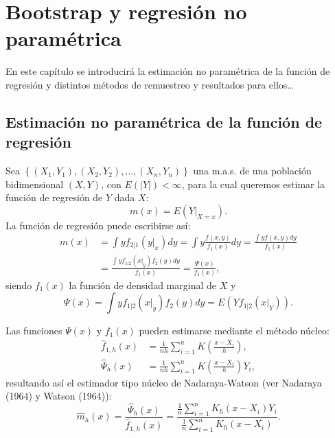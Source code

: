 \documentclass[
]{book}
\theoremstyle{definition}
\theoremstyle{definition}
\theoremstyle{definition}
\theoremstyle{remark}
\begin{document}
\hypertarget{cap7}{%
\chapter{Bootstrap y regresión no paramétrica}\label{cap7}}

En este capítulo se introducirá la estimación no paramétrica de la función de regresión y distintos métodos de remuestreo y resultados para ellos\ldots{}

\hypertarget{estimaciuxf3n-no-paramuxe9trica-de-la-funciuxf3n-de-regresiuxf3n}{%
\section{Estimación no paramétrica de la función de regresión}\label{estimaciuxf3n-no-paramuxe9trica-de-la-funciuxf3n-de-regresiuxf3n}}

Sea \(\left\{ \left( X_1,Y_1 \right),\left( X_2,Y_2 \right), \ldots, \left( X_n,Y_n \right) \right\}\) una m.a.s. de una población
bidimensional \(\left( X,Y \right)\), con \(E\left( \left\vert Y\right\vert  \right) <\infty\), para la cual queremos estimar la función de regresión
de \(Y\) dada \(X\):
\[m\left( x \right) =E\left( \left. Y\right\vert_{X=x} \right).\]
La función de regresión puede escribirse así:
\[\begin{aligned}
m\left( x \right) &= \int yf_{2|1}\left( \left. y\right\vert _{x} \right)
dy=\int y\frac{f\left( x,y \right)}{f_1\left( x \right)}dy=\frac{\int
yf\left( x,y \right) dy}{f_1\left( x \right)} \\
&= \frac{\int yf_{1|2}\left( \left. x\right\vert _{y} \right) f_2\left(
y \right) dy}{f_1\left( x \right)}=\frac{\Psi \left( x \right)}{f_1\left(
x \right)},
\end{aligned}\]
siendo \(f_1\left( x \right)\) la función de densidad marginal de \(X\) y
\[\Psi \left( x \right) =\int yf_{1|2}\left( \left. x\right\vert _{y} \right)
f_2\left( y \right) dy=E\left( Yf_{1|2}\left( \left. x\right\vert_{Y} \right)
\right).\]

Las funciones \(\Psi \left( x \right)\) y \(f_1\left( x \right)\) pueden
estimarse mediante el método núcleo:
\[\begin{aligned}
\hat{f}_{1,h}\left( x \right) &= \frac{1}{nh}\sum_{i=1}^{n}K\left( \frac{
x-X_i}{h} \right), \\
\hat{\Psi}_{h}\left( x \right) &= \frac{1}{nh}\sum_{i=1}^{n}K\left( \frac{
x-X_i}{h} \right) Y_i,
\end{aligned}\]
resultando así el estimador tipo núcleo de Nadaraya-Watson
(ver Nadaraya (1964) y Watson (1964)):
\[\hat{m}_{h}\left( x \right) =\frac{\hat{\Psi}_{h}\left( x \right)}{\hat{f}
_{1,h}\left( x \right)}=\frac{\frac{1}{n}\sum_{i=1}^{n}K_{h}\left(
x-X_i \right) Y_i}{\frac{1}{n}\sum_{i=1}^{n}K_{h}\left( x-X_i \right)}.\]
\end{document}
